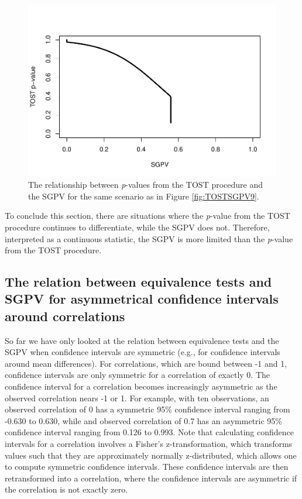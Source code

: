 \documentclass[,man,floatsintext]{apa6}
\begin{document}
\begin{figure}
\centering
\includegraphics{manuscript.R1_files/figure-latex/TOSTSGPV10-1.pdf}
\caption{\label{fig:TOSTSGPV10}The relationship between \emph{p}-values from
the TOST procedure and the SGPV for the same scenario as in Figure
\ref{fig:TOSTSGPV9}.}
\end{figure}

To conclude this section, there are situations where the \emph{p}-value
from the TOST procedure continues to differentiate, while the SGPV does
not. Therefore, interpreted as a continuous statistic, the SGPV is more
limited than the \emph{p}-value from the TOST procedure.

\subsection{The relation between equivalence tests and SGPV for
asymmetrical confidence intervals around
correlations}\label{the-relation-between-equivalence-tests-and-sgpv-for-asymmetrical-confidence-intervals-around-correlations}

So far we have only looked at the relation between equivalence tests and
the SGPV when confidence intervals are symmetric (e.g., for confidence
intervals around mean differences). For correlations, which are bound
between -1 and 1, confidence intervals are only symmetric for a
correlation of exactly 0. The confidence interval for a correlation
becomes increasingly asymmetric as the observed correlation nears -1 or
1. For example, with ten observations, an observed correlation of 0 has
a symmetric 95\% confidence interval ranging from -0.630 to 0.630, while
and observed correlation of 0.7 has an asymmetric 95\% confidence
interval ranging from 0.126 to 0.993. Note that calculating confidence
intervals for a correlation involves a Fisher's z-transformation, which
transforms values such that they are approximately normally
z-distributed, which allows one to compute symmetric confidence
intervals. These confidence intervals are then retransformed into a
correlation, where the confidence intervals are asymmetric if the
correlation is not exactly zero.
\end{document}
